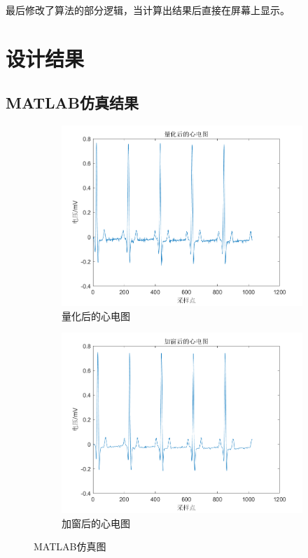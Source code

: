 \documentclass{article}
\newcounter{sub}
\begin{document}
最后修改了算法的部分逻辑，当计算出结果后直接在屏幕上显示。

\section{设计结果}%
\label{sec:设计结果}

\subsection{MATLAB仿真结果}%
\label{sub:MATLAB仿真结果}

\begin{figure}[H]
	\centering
	\begin{subfigure}[H]{.45\linewidth}
		\centering
		\includegraphics[width=\linewidth]{arb1.png}
		\caption{量化后的心电图}
		\label{fig:量化后的心电图}
	\end{subfigure}
	\quad
	\begin{subfigure}[H]{.45\linewidth}
		\centering
		\includegraphics[width=\linewidth]{arb2.png}
		\caption{加窗后的心电图}
		\label{fig:加窗后的心电图}
	\end{subfigure}
	\caption{MATLAB仿真图}
	\label{fig:MATLAB仿真图}
\end{figure}
\end{document}
